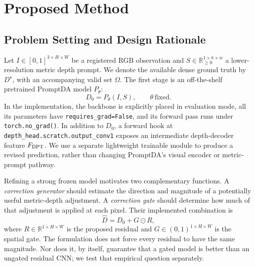 \section{Proposed Method}
\label{sec:method}
\subsection{Problem Setting and Design Rationale}
Let $I\in[0,1]^{3\times H\times W}$ be a registered RGB observation and $S\in\mathbb R_{\ge0}^{1\times h\times w}$ a lower-resolution metric depth prompt. We denote the available dense ground truth by $D^\star$, with an accompanying valid set $\Omega$. The first stage is an off-the-shelf pretrained PromptDA model $P_\theta$:
\begin{equation}
D_0=P_\theta(I,S), \qquad \theta\ \text{fixed}.
\label{eq:base}
\end{equation}
In the implementation, the backbone is explicitly placed in evaluation mode, all its parameters have \texttt{requires\_grad=False}, and its forward pass runs under \texttt{torch.no\_grad()}. In addition to $D_0$, a forward hook at \texttt{depth\_head.scratch.output\_conv1} exposes an intermediate depth-decoder feature $F_{\rm DPT}$. We use a separate lightweight trainable module to produce a revised prediction, rather than changing PromptDA's visual encoder or metric-prompt pathway.

Refining a strong frozen model motivates two complementary functions. A \emph{correction generator} should estimate the direction and magnitude of a potentially useful metric-depth adjustment. A \emph{correction gate} should determine how much of that adjustment is applied at each pixel. Their implemented combination is
\begin{equation}
\widehat D=D_0+G\odot R,
\label{eq:refine}
\end{equation}
where $R\in\mathbb R^{1\times H\times W}$ is the proposed residual and $G\in(0,1)^{1\times H\times W}$ is the spatial gate. The formulation does not force every residual to have the same magnitude. Nor does it, by itself, guarantee that a gated model is better than an ungated residual CNN; we test that empirical question separately.

